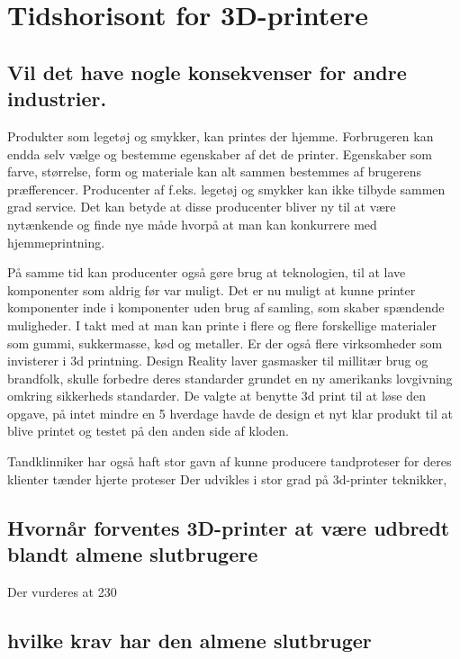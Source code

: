 
\chapter{Tidshorisont for 3D-printere}
\section{Vil det have nogle konsekvenser for andre industrier.}


Produkter som legetøj og smykker, kan printes der hjemme. Forbrugeren kan endda selv vælge og bestemme egenskaber af det de printer. Egenskaber som farve, størrelse, form og materiale kan alt sammen bestemmes af brugerens præfferencer. Producenter af f.eks. legetøj og smykker kan ikke tilbyde sammen grad service. Det kan betyde at disse producenter bliver ny til at være nytænkende og finde nye måde hvorpå at man kan konkurrere med hjemmeprintning.

På samme tid kan producenter også gøre brug at teknologien, til at lave komponenter som aldrig før var muligt. Det er nu muligt at kunne printer komponenter inde i komponenter uden brug af samling, som skaber spændende muligheder.
I takt med at man kan printe i flere og flere forskellige materialer som gummi, sukkermasse, kød og metaller. Er der også flere virksomheder som invisterer i 3d printning.
Design Reality laver gasmasker til millitær brug og brandfolk, skulle forbedre deres standarder grundet en ny amerikanks lovgivning omkring sikkerheds standarder. De valgte at benytte 3d print til at løse den opgave, på intet mindre en 5 hverdage havde de design et nyt klar produkt til at blive printet og testet på den anden side af kloden.
\cite{_design_2013}

Tandklinniker har også haft stor gavn af kunne producere tandproteser for deres klienter
tænder
hjerte
proteser
 Der udvikles i stor grad på 3d-printer teknikker,  

\section{Hvornår forventes 3D-printer at være udbredt blandt almene slutbrugere}


Der vurderes at 230

\section{hvilke krav har den almene slutbruger}